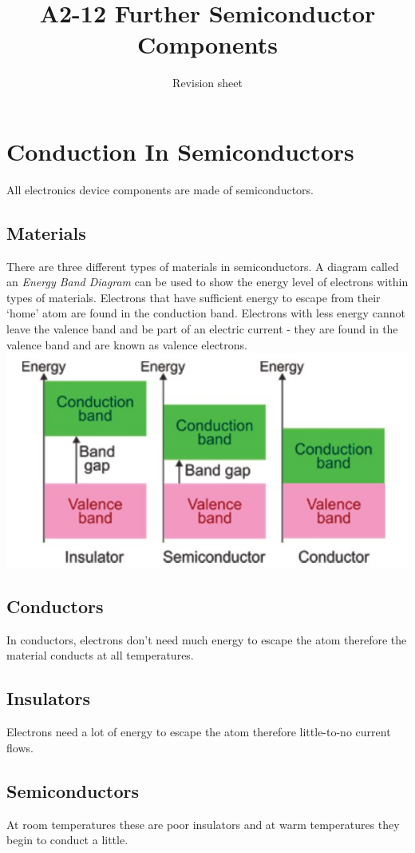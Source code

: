 \documentclass[a4paper,11pt, twocolumn]{article}
\title{A2-12 Further Semiconductor Components}
\author{Revision sheet}
\date{}
\begin{document}
\maketitle
\thispagestyle{fancy}


\section{Conduction In Semiconductors}
All electronics device components are made of semiconductors.
\subsection{Materials}
There are three different types of materials in semiconductors.
A diagram called an \textit{Energy Band Diagram} can be used to show the energy level of electrons within types of materials. Electrons that have sufficient energy to escape from their `home' atom are found in the conduction band. Electrons with less energy cannot leave the valence band and be part of an electric current - they are found in the valence band and are known as valence electrons. 
\includegraphics[width=\linewidth]{energyBandDiagram.jpg}
\subsection{Conductors}
In conductors, electrons don't need much energy to escape the atom therefore the material conducts at all temperatures.
\subsection{Insulators}
Electrons need a lot of energy to escape the atom therefore little-to-no  current flows.
\subsection{Semiconductors}
At room temperatures these are poor insulators and at warm temperatures they begin to conduct a little.
\end{document}
